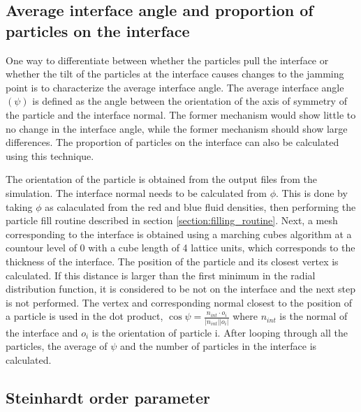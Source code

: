 \subsection{Average interface angle and proportion of particles on the interface}
\label{section:interface_angle}

One way to differentiate between whether the particles pull the interface or whether the tilt of the particles at 
the interface causes changes to the jamming point is to characterize the average interface angle. The average interface 
angle $(\psi)$ is defined as the angle between the orientation of the axis of symmetry of the particle and the interface 
normal. The former mechanism would show little to no change in the interface angle, while the former mechanism should 
show large differences. The proportion of particles on the interface can also be calculated using this technique. 

The orientation of the particle is obtained from the output files from the simulation. The interface normal needs to 
be calculated from $\phi$. This is done by taking $\phi$ as calaculated from the red and blue fluid densities, then 
performing the particle fill routine described in section \ref{section:filling_routine}. Next, a mesh corresponding 
to the interface is obtained using a marching cubes algorithm at a countour level of 0 with a cube length of 4 lattice 
units, which corresponds to the thickness of the interface. \cite{van_der_walt_scikit-image:_2014} The 
position of the particle and its closest vertex is calculated. If this distance is larger than the first minimum in 
the radial distribution function, it is considered to be not on the interface and the next step is not performed. The 
vertex and corresponding normal closest to the position of a particle is used in the dot product, 
$\cos{\psi} = \frac{n_{int} \cdot o_{i}}{|n_{int}| |o_i|}$ where $n_{int}$ is the normal of the interface and $o_i$ 
is the orientation of particle i. After looping through all the particles, the average of $\psi$ and the number of 
particles in the interface is calculated.

\subsection{Steinhardt order parameter}
\label{section:steinhardt_order_parameter}

